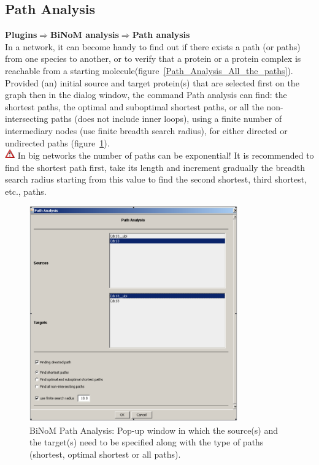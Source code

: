 \subsection{Path Analysis}\label{Path_Analysis}
\textbf{Plugins$\Rightarrow$BiNoM analysis$\Rightarrow$Path analysis}\\
In a network, it can become handy to find out if there exists a path (or paths) from one species to another, or to verify that a protein or a protein complex is reachable from a starting molecule(figure~\ref{Path_Analysis_All_the_paths}). Provided (an) initial source and target protein(s) that are selected first on the graph then in the dialog window, the command Path analysis can find: the shortest paths, the optimal and suboptimal shortest paths, or all the non-intersecting paths (does not include inner loops), using a finite number of intermediary nodes (use finite breadth search radius), for either directed or undirected paths (figure~\ref{Path_Analysis_Pop-up_window}).\\
\includegraphics[width=12pt,height=12pt]{graphics/warning} In big networks the number of paths can be exponential! It is recommended to find the shortest path first, take its length and increment gradually the breadth search radius starting from this value to find the second shortest, third shortest, etc., paths.\\
\begin{figure}
\centering
\includegraphics[width=0.8\textwidth]{graphics/Path_Analysis_Pop-up_window}
\caption{BiNoM Path Analysis: Pop-up window in which the source(s) and the target(s) need to be specified along with the type of paths (shortest, optimal shortest or all paths).}
\label{Path_Analysis_Pop-up_window}
\end{figure}

